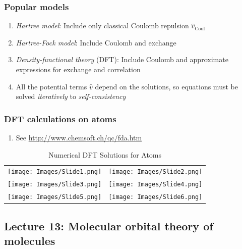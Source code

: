 \documentclass[11pt]{article}
\begin{document}
\subsubsection{Popular models}
\label{sec:org0de1837}
\begin{enumerate}
\item \emph{Hartree model}: Include only classical Coulomb repulsion \(\hat v_\mathrm{Coul}\)
\item \emph{Hartree-Fock model}: Include Coulomb and exchange
\item \emph{Density-functional theory} (DFT): Include Coulomb and
approximate expressions for exchange and correlation
\item All the potential terms \(\hat v\) depend on the solutions, so equations
must be solved \emph{iteratively} to \emph{self-consistency}
\end{enumerate}
\subsubsection{DFT calculations on atoms}
\label{sec:orge0a7b19}
\begin{enumerate}
\item See \url{http://www.chemsoft.ch/qc/fda.htm}
\end{enumerate}

\begin{table}[]
   \caption{Numerical DFT Solutions for Atoms }
\begin{tabular}{cc}
\texttt{[image: Images/Slide1.png]} & \texttt{[image: Images/Slide2.png]} \\
\texttt{[image: Images/Slide3.png]} & \texttt{[image: Images/Slide4.png]} \\
\texttt{[image: Images/Slide5.png]} & \texttt{[image: Images/Slide6.png]} 
\end{tabular}
\end{table}

\subsection{Lecture 13: Molecular orbital theory of molecules}
\label{sec:orga2f58b5}
\end{document}
